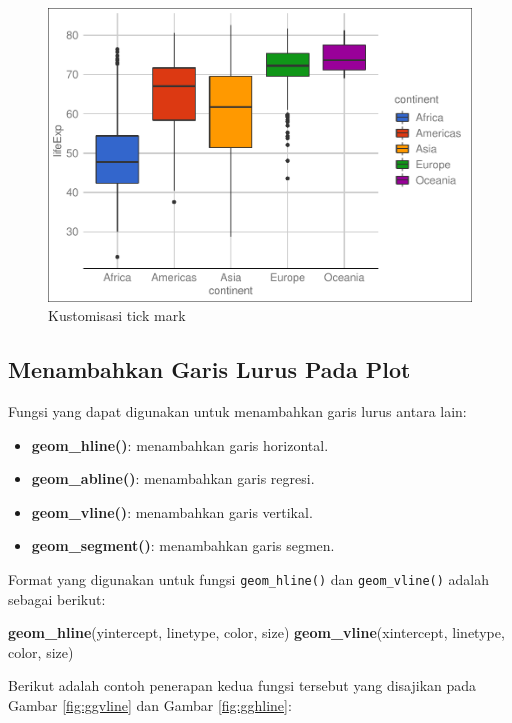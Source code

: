 \documentclass[]{book}
\newenvironment{Shaded}{\begin{snugshade}}{\end{snugshade}}
\newcommand{\KeywordTok}[1]{\textcolor[rgb]{0.13,0.29,0.53}{\textbf{#1}}}
\newcommand{\NormalTok}[1]{#1}
\providecommand{\tightlist}{%
  \setlength{\itemsep}{0pt}\setlength{\parskip}{0pt}}
\begin{document}
\begin{figure}

{\centering \includegraphics[width=0.7\linewidth]{EnvStat_files/figure-latex/ggtick4-1} 

}

\caption{Kustomisasi tick mark}\label{fig:ggtick4}
\end{figure}

\subsection{Menambahkan Garis Lurus Pada
Plot}\label{menambahkan-garis-lurus-pada-plot}

Fungsi yang dapat digunakan untuk menambahkan garis lurus antara lain:

\begin{itemize}
\tightlist
\item
  \textbf{geom\_hline()}: menambahkan garis horizontal.
\item
  \textbf{geom\_abline()}: menambahkan garis regresi.
\item
  \textbf{geom\_vline()}: menambahkan garis vertikal.
\item
  \textbf{geom\_segment()}: menambahkan garis segmen.
\end{itemize}

Format yang digunakan untuk fungsi \texttt{geom\_hline()} dan
\texttt{geom\_vline()} adalah sebagai berikut:

\begin{Shaded}
\begin{Highlighting}[]
\KeywordTok{geom_hline}\NormalTok{(yintercept, linetype, color, size)}
\KeywordTok{geom_vline}\NormalTok{(xintercept, linetype, color, size)}
\end{Highlighting}
\end{Shaded}

Berikut adalah contoh penerapan kedua fungsi tersebut yang disajikan
pada Gambar \ref{fig:ggvline} dan Gambar \ref{fig:gghline}:
\end{document}
